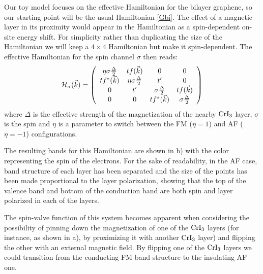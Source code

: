 Our toy model focuses on the effective Hamiltonian for the bilayer graphene, so our starting point will be the usual Hamiltonian \eqref{Gbi}. The effect of a magnetic layer in its proximity would appear in the Hamiltonian as a spin-dependent on-site energy shift.
For simplicity rather than duplicating the size of the Hamiltonian we will keep a $4\times4$ Hamiltonian but make it spin-dependent. The effective Hamiltonian for the spin channel $\sigma$ then reads:
\begin{eqnarray}
{\cal H}_{\sigma}(\vec{k})=\left(
\begin{array}{cccc}
\eta\sigma \frac{\Delta}{2} & tf(\vec{k}) & 0& 0 \\
tf^*(\vec{k}) & \eta\sigma \frac{\Delta}{2} & t' & 0 \\
0 & t'  &  \sigma \frac{\Delta}{2} &  tf(\vec{k})\\
 0 & 0 &  tf^*(\vec{k}) & \sigma \frac{\Delta}{2}
\end{array}
\right)
\label{hmodel}
\end{eqnarray}
where $\Delta$ is the effective strength of the magnetization of the nearby $\ce{CrI_3}$ layer, $\sigma$ is the spin and $\eta$ is a parameter to switch between the FM ($\eta=1$) and AF ($\eta=-1$) configurations.

The resulting bands for this Hamiltonian are shown in b) with the color representing the spin of the electrons. For the sake of readability, in the AF case, band structure of each layer has been separated and the size of the points has been made proportional to the layer polarization, showing that the top of the valence band and bottom of the conduction band are both spin and layer polarized in each of the layers.


The spin-valve function of this system becomes apparent when considering the possibility of pinning down the magnetization of one of the $\ce{CrI_3}$ layers (for instance, as shown in a), by proximizing it with another $\ce{CrI_3}$ layer) and flipping the other with an external magnetic field.
By flipping one of the $\ce{CrI_3}$ layers we could transition from the conducting FM band structure to the insulating AF one.



